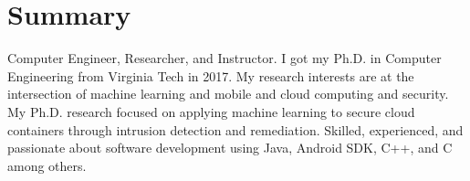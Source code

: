 \section{Summary}
Computer Engineer, Researcher, and Instructor. I got my Ph.D. in Computer Engineering from Virginia Tech in 2017. 
My research interests are at the intersection of machine learning and mobile and cloud computing and security. 
My Ph.D. research focused on applying machine learning to secure cloud containers through intrusion detection and remediation. 
Skilled, experienced, and passionate about software development using Java, Android SDK, C++, and C among others.